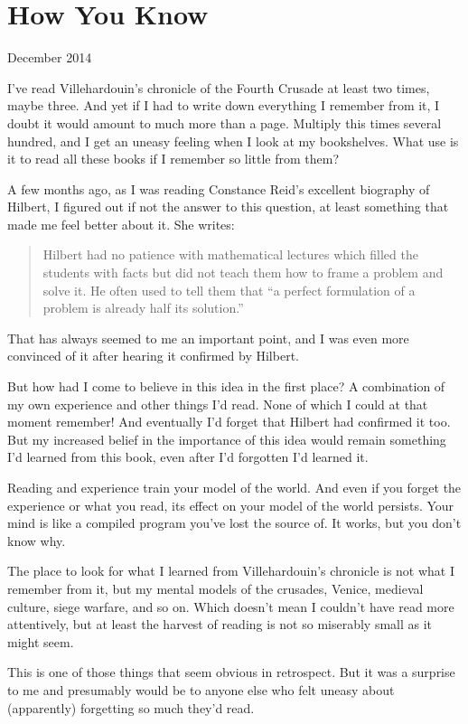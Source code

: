 \chapter{How You Know}

December 2014

I've read Villehardouin's chronicle of the Fourth Crusade at least two
times, maybe three. And yet if I had to write down everything I remember
from it, I doubt it would amount to much more than a page. Multiply this
times several hundred, and I get an uneasy feeling when I look at my
bookshelves. What use is it to read all these books if I remember so
little from them?

A few months ago, as I was reading Constance Reid's excellent biography
of Hilbert, I figured out if not the answer to this question, at least
something that made me feel better about it. She writes:

\begin{quote}
Hilbert had no patience with mathematical lectures which filled the
students with facts but did not teach them how to frame a problem and
solve it. He often used to tell them that ``a perfect formulation of a
problem is already half its solution.''
\end{quote}

That has always seemed to me an important point, and I was even more
convinced of it after hearing it confirmed by Hilbert.

But how had I come to believe in this idea in the first place? A
combination of my own experience and other things I'd read. None of
which I could at that moment remember! And eventually I'd forget that
Hilbert had confirmed it too. But my increased belief in the importance
of this idea would remain something I'd learned from this book, even
after I'd forgotten I'd learned it.

Reading and experience train your model of the world. And even if you
forget the experience or what you read, its effect on your model of the
world persists. Your mind is like a compiled program you've lost the
source of. It works, but you don't know why.

The place to look for what I learned from Villehardouin's chronicle is
not what I remember from it, but my mental models of the crusades,
Venice, medieval culture, siege warfare, and so on. Which doesn't mean I
couldn't have read more attentively, but at least the harvest of reading
is not so miserably small as it might seem.

This is one of those things that seem obvious in retrospect. But it was
a surprise to me and presumably would be to anyone else who felt uneasy
about (apparently) forgetting so much they'd read.

